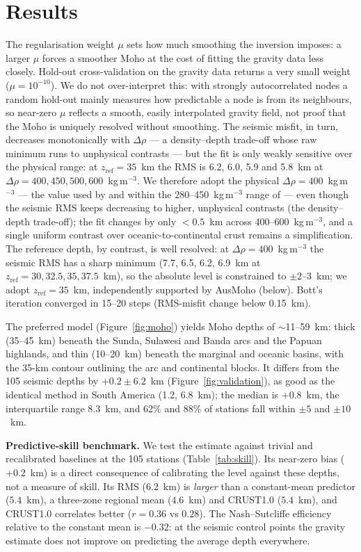 \documentclass{agujournal2019}
\begin{document}
\section{Results}
The regularisation weight $\mu$ sets how much smoothing the inversion imposes: a
larger $\mu$ forces a smoother Moho at the cost of fitting the gravity data less
closely. Hold-out cross-validation on the gravity data returns a very small weight
($\mu=10^{-10}$). We do not over-interpret this: with strongly autocorrelated nodes
a random hold-out mainly measures how predictable a node is from its neighbours, so
near-zero $\mu$ reflects a smooth, easily interpolated gravity field, not proof that
the Moho is uniquely resolved without smoothing. The seismic misfit, in
turn, decreases monotonically with $\Delta\rho$ --- a
density--depth trade-off whose raw minimum runs to unphysical contrasts --- but the
fit is only weakly sensitive over the physical range: at $z_{\mathrm{ref}}=35$~km
the RMS is 6.2, 6.0, 5.9 and 5.8~km at $\Delta\rho=400,450,500,600$~kg\,m$^{-3}$. We
therefore adopt the physical $\Delta\rho=400$~kg\,m$^{-3}$ --- the value used by
\citet{uieda2017} and within the 280--450~kg\,m$^{-3}$ range of \citet{christensen1995}
--- even though the seismic RMS keeps decreasing to higher, unphysical contrasts
(the density--depth trade-off); the fit changes by only $<0.5$~km across
400--600~kg\,m$^{-3}$, and a single uniform contrast over oceanic-to-continental
crust remains a simplification.
The reference depth, by contrast, is well resolved: at $\Delta\rho=400$~kg\,m$^{-3}$
the seismic RMS has a sharp minimum (7.7, 6.5, 6.2, 6.9~km at
$z_{\mathrm{ref}}=30, 32.5, 35, 37.5$~km), so the absolute level is constrained to
$\pm2$--$3$~km; we adopt $z_{\mathrm{ref}}=35$~km, independently supported by AusMoho
(below). Bott's iteration converged in 15--20 steps (RMS-misfit change below
0.15~km).

The preferred model (Figure~\ref{fig:moho}) yields Moho depths of $\sim$11--59~km:
thick (35--45~km) beneath the Sunda, Sulawesi and Banda arcs and the Papuan
highlands, and thin (10--20~km) beneath the marginal and oceanic basins, with the
35-km contour outlining the arc and continental blocks. It differs from the 105
seismic depths by $+0.2\pm6.2$~km (Figure~\ref{fig:validation}), as good as the
identical method in South America (1.2, 6.8~km); the median is $+0.8$~km, the
interquartile range 8.3~km, and 62\% and 88\% of stations fall within $\pm5$ and
$\pm10$~km.

\textbf{Predictive-skill benchmark.} We test the estimate against trivial and
recalibrated baselines at the 105 stations (Table~\ref{tab:skill}). Its near-zero
bias ($+0.2$~km) is a direct consequence of calibrating the level against these
depths, not a measure of skill. Its RMS ($6.2$~km) is \emph{larger} than a
constant-mean predictor ($5.4$~km), a three-zone regional mean ($4.6$~km) and
CRUST1.0 ($5.4$~km), and CRUST1.0 correlates better ($r=0.36$ vs $0.28$). The
Nash--Sutcliffe efficiency relative to the constant mean is $-0.32$: at the seismic
control points the gravity estimate does not improve on predicting the average depth
everywhere.
\end{document}
